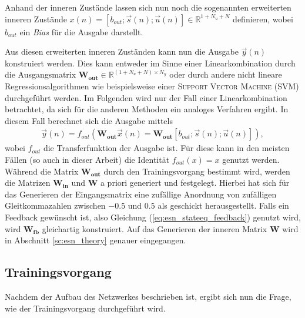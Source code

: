 Anhand der inneren Zustände lassen sich nun noch die sogenannten erweiterten inneren Zustände $x(n) = [b_{out}; \vec{s}(n); \vec{u}(n)] \in \mathbb{R}^{1 + N_u + N}$ definieren, wobei $b_{out}$ ein \textit{Bias} für die Ausgabe darstellt. 

Aus diesen erweiterten inneren Zuständen kann nun die Ausgabe $\vec{y}(n)$ konstruiert werden. Dies kann entweder im Sinne einer Linearkombination durch die Ausgangsmatrix $\mathbf{W_{out}} \in \mathbb{R}^{(1 + N_u + N) \times N_y}$ oder durch andere nicht lineare Regressionsalgorithmen wie beispielsweise einer \textsc{Support Vector Machine (SVM)} durchgeführt werden. Im Folgenden wird nur der Fall einer Linearkombination betrachtet, da sich für die anderen Methoden ein analoges Verfahren ergibt.
In diesem Fall berechnet sich die Ausgabe mittels
\begin{align}
\vec{y}(n) = f_{out} \left( \mathbf{W_{out}} \vec{x}(n) = \mathbf{W_{out}} [b_{out}; \vec{s}(n); \vec{u}(n)] \right),
\end{align}
wobei $f_{out}$ die Transferfunktion der Ausgabe ist. Für diese kann in den meisten Fällen (so auch in dieser Arbeit) die Identität $f_{out}(x) = x$ genutzt werden.\\

Während die Matrix $\mathbf{W_{out}}$ durch den Trainingsvorgang bestimmt wird, werden die Matrizen $\mathbf{W_{in}}$ und $\mathbf{W}$ a priori generiert und festgelegt. Hierbei hat sich für das Generieren der Eingangsmatrix eine zufällige Anordnung von zufälligen Gleitkommazahlen zwischen $-0.5$ und $0.5$ als geschickt herausgestellt. Falls ein Feedback gewünscht ist, also Gleichung (\ref{eq:esn_stateeq_feedback}) genutzt wird, wird $\mathbf{W_{fb}}$ gleichartig konstruiert. Auf das Generieren der inneren Matrix $\mathbf{W}$ wird in Abschnitt \ref{sc:esn_theory} genauer eingegangen.

\subsection{Trainingsvorgang}
Nachdem der Aufbau des Netzwerkes beschrieben ist, ergibt sich nun die Frage, wie der Trainingsvorgang durchgeführt wird.

